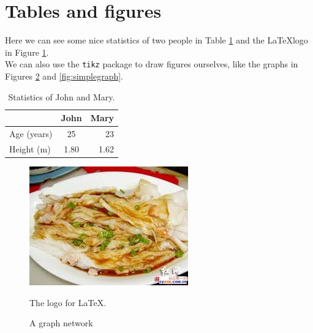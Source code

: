 \documentclass[a4paper,11pt]{article}
\begin{document}
\section{Tables and figures}
Here we can see some nice statistics of two people in Table \ref{table:johnmary} and the \LaTeX logo in Figure \ref{fig:latexlogo}. \\      %
We can also use the \texttt{tikz} package to draw figures ourselves, like the graphs in Figures \ref{fig:graph} and \ref{fig:simplegraph}.

\begin{table}[!htpb]
\centering
{\begin{tabular}{|l|c|r|}
\hline
 & John & Mary\\
\hline
Age (years)	& 25   & 23 \\
Height (m)	& 1.80 & 1.62\\
\hline
\end{tabular}}
\caption{Statistics of John and Mary.
\label{table:johnmary}}
\end{table}

\begin{figure}[!htpb]
\centering
{\includegraphics[scale=0.1]{kill_for_this}}
\caption{The logo for \LaTeX.
\label{fig:latexlogo}}
\end{figure}

\begin{figure}[!htpb]
\centering
{\scriptsize
{}
}
\caption{A graph network
\label{fig:graph}}
\end{figure}
\end{document}
